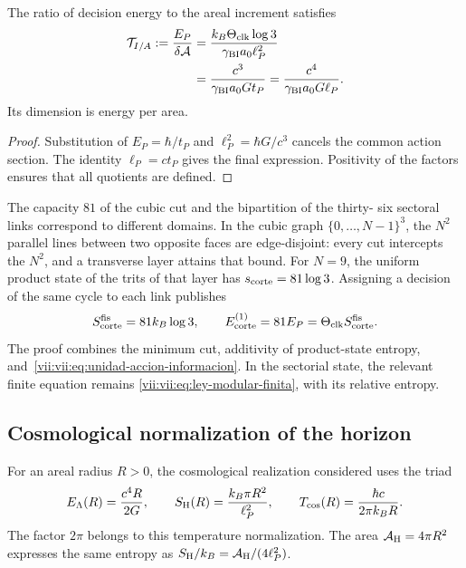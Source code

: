 \begin{proposition}
\label{vii:vii:prop:tension-informacion-area}
The ratio of decision energy to the areal increment satisfies
\begin{equation}
 \begin{aligned}
 \mathcal T_{I/A}:=\frac{E_P}{\delta\mathcal A}
 &=\frac{k_B\Theta_{\rm clk}\log3}{\gamma_{\rm BI}a_0\ell_P^2}\\
 &=\frac{c^3}{\gamma_{\rm BI}a_0G t_P}
  =\frac{c^4}{\gamma_{\rm BI}a_0G\ell_P}.
 \end{aligned}
 \label{vii:vii:eq:tension-informacion-area}
\end{equation}
Its dimension is energy per area.
\end{proposition}
\begin{proof}
Substitution of \(E_P=\hbar/t_P\) and
\(\ell_P^2=\hbar G/c^3\) cancels the common action section.
The identity \(\ell_P=ct_P\) gives the final expression. Positivity
of the factors ensures that all quotients are defined.
\end{proof}

The capacity \(81\) of the cubic cut and the bipartition of the thirty-
six sectoral links correspond to different domains. In the
cubic graph \(\{0,\ldots,N-1\}^3\), the \(N^2\) parallel lines
between two opposite faces are edge-disjoint: every cut
intercepts the \(N^2\), and a transverse layer attains that bound.
For \(N=9\), the uniform product state of the trits of that layer
has \(s_{\rm corte}=81\log3\). Assigning a decision of the
same cycle to each link publishes
\begin{equation}
 S_{\rm corte}^{\rm fis}=81k_B\log3,\qquad
 E_{\rm corte}^{(1)}=81E_P
                  =\Theta_{\rm clk}S_{\rm corte}^{\rm fis}.
 \label{vii:vii:eq:corte-energia-informacion}
\end{equation}
The proof combines the minimum cut, additivity of product-state
entropy, and~\eqref{vii:vii:eq:unidad-accion-informacion}. In the sectorial
state, the relevant finite equation remains
\eqref{vii:vii:eq:ley-modular-finita}, with its relative entropy.

\subsection{Cosmological normalization of the horizon}
\label{vii:vii:subsec:balance-horizonte}

For an areal radius \(R>0\), the cosmological realization considered
uses the triad
\begin{equation}
 E_\Lambda(R)=\frac{c^4R}{2G},\qquad
 S_{\rm H}(R)=\frac{k_B\pi R^2}{\ell_P^2},\qquad
 T_{\rm cos}(R)=\frac{\hbar c}{2\pi k_BR}.
 \label{vii:vii:eq:horizonte-cosmologico}
\end{equation}
The factor \(2\pi\) belongs to this temperature normalization.
The area \(\mathcal A_{\rm H}=4\pi R^2\) expresses the same entropy
as \(S_{\rm H}/k_B=\mathcal A_{\rm H}/(4\ell_P^2)\).

